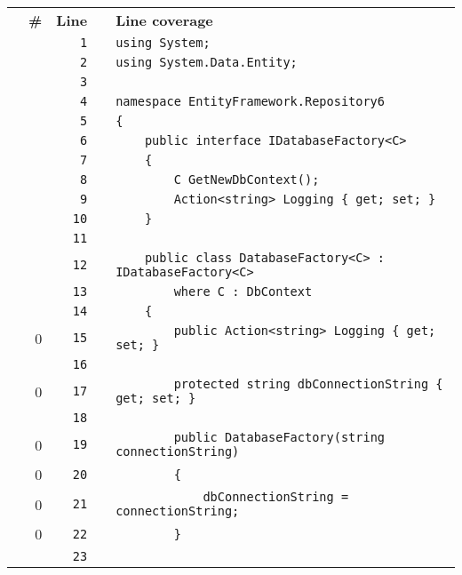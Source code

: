 \documentclass[a4paper,10pt]{article}
\begin{document}
\begin{longtable}[l]{lrrll}
\textbf{} & \textbf{\#} & \textbf{Line} & \textbf{} & \textbf{Line coverage}\\
\cellcolor{gray} &  & \verb~1~ & & \verb~using System;~\\
\cellcolor{gray} &  & \verb~2~ & & \verb~using System.Data.Entity;~\\
\cellcolor{gray} &  & \verb~3~ & & \verb~~\\
\cellcolor{gray} &  & \verb~4~ & & \verb~namespace EntityFramework.Repository6~\\
\cellcolor{gray} &  & \verb~5~ & & \verb~{~\\
\cellcolor{gray} &  & \verb~6~ & & \verb~    public interface IDatabaseFactory<C>~\\
\cellcolor{gray} &  & \verb~7~ & & \verb~    {~\\
\cellcolor{gray} &  & \verb~8~ & & \verb~        C GetNewDbContext();~\\
\cellcolor{gray} &  & \verb~9~ & & \verb~        Action<string> Logging { get; set; }~\\
\cellcolor{gray} &  & \verb~10~ & & \verb~    }~\\
\cellcolor{gray} &  & \verb~11~ & & \verb~~\\
\cellcolor{gray} &  & \verb~12~ & & \verb~    public class DatabaseFactory<C> : IDatabaseFactory<C>~\\
\cellcolor{gray} &  & \verb~13~ & & \verb~        where C : DbContext~\\
\cellcolor{gray} &  & \verb~14~ & & \verb~    {~\\
\cellcolor{red} & 0 & \verb~15~ & & \verb~        public Action<string> Logging { get; set; }~\\
\cellcolor{gray} &  & \verb~16~ & & \verb~~\\
\cellcolor{red} & 0 & \verb~17~ & & \verb~        protected string dbConnectionString { get; set; }~\\
\cellcolor{gray} &  & \verb~18~ & & \verb~~\\
\cellcolor{red} & 0 & \verb~19~ & & \verb~        public DatabaseFactory(string connectionString)~\\
\cellcolor{red} & 0 & \verb~20~ & & \verb~        {~\\
\cellcolor{red} & 0 & \verb~21~ & & \verb~            dbConnectionString = connectionString;~\\
\cellcolor{red} & 0 & \verb~22~ & & \verb~        }~\\
\cellcolor{gray} &  & \verb~23~ & & \verb~~\\

\end{longtable}
\end{document}
